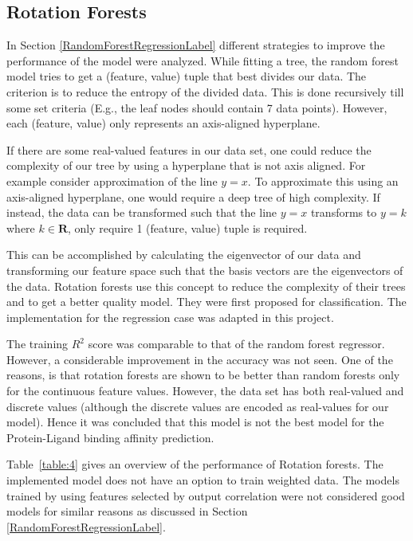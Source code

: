 \documentclass[11pt]{article}
\begin{document}
\subsection{Rotation Forests}

In Section \ref{RandomForestRegressionLabel} different strategies to improve the performance of the model were analyzed.
While fitting a tree, the random forest model tries to get a (feature, value) tuple that best divides our data.  The criterion is to reduce the entropy of the divided data.
This is done recursively till some set criteria (E.g., the leaf nodes should contain 7 data points).
However,  each (feature, value) only represents an axis-aligned hyperplane.

If there are some real-valued features in our data set,  one could reduce the complexity of our tree by using a hyperplane that is not axis aligned.
For example consider approximation of the line $y = x$.
To approximate this using an axis-aligned hyperplane,  one would require a deep tree of high complexity.
If instead, the data can be transformed such that the line $y = x$ transforms to $y = k$ where $k \in \mathbf{R}$,  only require 1 (feature, value) tuple is required.

This can be accomplished by calculating the eigenvector of our data and transforming our feature space such that the basis vectors are the eigenvectors of the data.
Rotation forests use this concept to reduce the complexity of their trees and to get a better quality model. 
They were first proposed for classification.  The implementation for the regression case was adapted in this project.

The training $R^2$ score was comparable to that of the random forest regressor.
However,  a considerable improvement in the accuracy was not seen.
One of the reasons,  is that rotation forests are shown to be better than random forests only for the continuous feature values.
However,  the data set has both real-valued and discrete values (although the discrete values are encoded as real-values for our model).
Hence it was concluded that this model is not the best model for the Protein-Ligand binding affinity prediction.

Table~\ref{table:4} gives an overview of the performance of Rotation forests.
The implemented model does not have an option to train weighted data.
The models trained by using features selected by output correlation were not considered good models for similar reasons as discussed in Section \ref{RandomForestRegressionLabel}.
\end{document}
